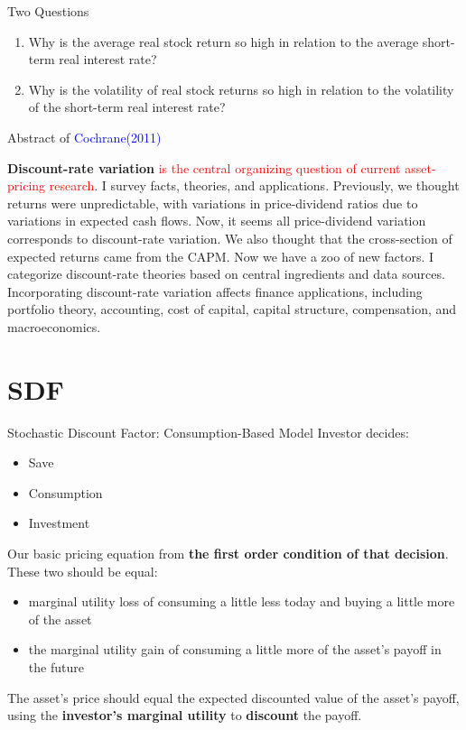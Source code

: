\documentclass{beamer}
\begin{document}
\begin{frame}{Two Questions}
	\begin{enumerate}
		\item Why is the average real stock return so high in relation to the average short-term real interest rate?
		\item Why is the volatility of real stock returns so high in relation to the volatility of the short-term real interest rate?

	\end{enumerate}
\end{frame}

\begin{frame}{Abstract of \textcolor{blue}{Cochrane(2011)}}

	\textbf{Discount-rate variation} \textcolor{red}{is the central organizing question of current asset-pricing research}. I survey facts, theories, and applications. Previously, we thought returns were unpredictable, with variations in price-dividend ratios due to variations in expected cash flows. Now, it seems all price-dividend variation corresponds to discount-rate variation. We also thought that the cross-section of expected returns came from the CAPM. Now we have a zoo of new factors. I categorize discount-rate theories based on central ingredients and data sources. Incorporating discount-rate variation affects finance applications, including portfolio theory, accounting, cost of capital, capital structure, compensation, and macroeconomics.

\end{frame}

\section{SDF}

\begin{frame}{Stochastic Discount Factor: Consumption-Based Model}
	Investor decides:
	\begin{itemize}
		\item Save
		\item Consumption
		\item Investment
	\end{itemize}

	Our basic pricing equation from \textbf{the first order condition of that decision}. These two should be equal:
	\begin{itemize}
		\item marginal utility loss of consuming a little less today and buying a little more of the asset
		\item the marginal utility gain of consuming a little more of the asset's payoff in the future
	\end{itemize}
	The asset's price should equal the expected discounted value of the asset's payoff, using the \textbf{investor's marginal utility} to \textbf{discount} the payoff.
\end{frame}
\end{document}
